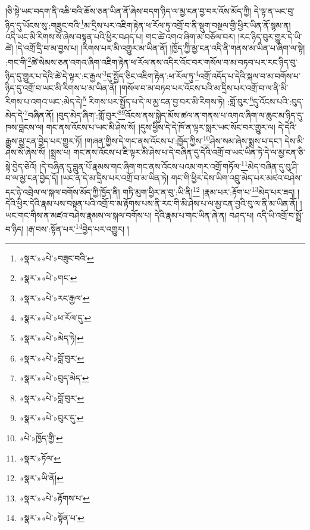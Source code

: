 །ཅི་སྟེ་ཡང་བདག་ནི་འཆི་བའི་ཆོས་ཅན་ཡིན་ནོ་ཞེས་བདག་ཉིད་ལ་མྱ་ངན་བྱ་བར་འོས་མོད་ཀྱི། དེ་ལྟ་ན་ཡང་བུ་ཉིད་དུ་ཡོངས་སུ་:གཟུང་བའི་\footnote{«སྣར་»«པེ་»བཟུང་བའི་}མ་དྲིས་པར་འཇིག་རྟེན་ཕ་རོལ་ཏུ་འགྲོ་བ་ནི་སྡུག་བསྔལ་གྱི་ཕྱིར་ཡིན་ནོ་སྙམ་ན། འདི་ཡང་མི་རིགས་སོ་ཞེས་བསྟན་པའི་ཕྱིར་བཤད་པ། གང་ཚེ་འགའ་ཞིག་མ་བཅོལ་བར། །རང་ཉིད་བུར་གྱུར་དེ་ཡི་ཚེ། །དེ་འགྲོ་དྲི་བ་མ་བྱས་པ། །རིགས་པར་མི་འགྱུར་མ་ཡིན་ནོ། །ཁྱོད་ཀྱི་མྱ་ངན་འདི་ནི་གནས་མ་ཡིན་པ་ཞིག་ལ་སྟེ། :གང་གི་\footnote{«སྣར་»«པེ་»གང་}ཚེ་སེམས་ཅན་འགའ་ཞིག་འཇིག་རྟེན་ཕ་རོལ་ནས་འདིར་འོང་བར་གསོལ་བ་མ་བཏབ་པར་རང་ཉིད་བུ་ཉིད་དུ་གྱུར་པ་དེའི་ཚེ་དེ་ལྟར་:ང་རྒྱལ་\footnote{«སྣར་»«པེ་»རང་རྒྱལ་}དུ་སྤྱོད་ཅིང་འཇིག་རྟེན་:ཕ་རོལ་ཏུ་\footnote{«སྣར་»«པེ་»ཕ་རོལ་དུ་}འགྲོ་འདོད་པ་དེའི་སྐལ་བ་མ་བགོས་པ་ཉིད་དུ་འགྲོ་བ་ཡང་མི་རིགས་པ་མ་ཡིན་ནོ། །གསོལ་བ་མ་བཏབ་པར་འོངས་པའི་མ་དྲིས་པར་འགྲོ་བ་ལ་ནི་མི་རིགས་པ་འགའ་ཡང་:མེད་དེ།\footnote{«སྣར་»«པེ་»མེད་ཏེ།} རིགས་པར་སྤྱོད་པ་དེ་ལ་མྱ་ངན་བྱ་བར་མི་རིགས་ཏེ། :གློ་བུར་\footnote{«སྣར་»«པེ་»བློ་བུར་}དུ་འོངས་པའི་:བུད་མེད་དེ་\footnote{«སྣར་»«པེ་»བུད་མེད་}བཞིན་ནོ། །བུད་མེད་ཞིག་:གློ་བུར་\footnote{«སྣར་»«པེ་»བློ་བུར་}\footnote{«སྣར་»«པེ་»བུར་དུ་}འོངས་ནས་སྐྱེད་མོས་ཚལ་ན་གནས་པ་འགའ་ཞིག་ལ་ཆུང་མ་ཉིད་དུ་ཁས་བླངས་ལ། གང་ནས་འོངས་པ་ཡང་མི་ཤེས་སོ། །དུས་ཕྱིས་དེ་དེ་ཁོ་ན་ལྟར་སླར་ཡང་སོང་བར་གྱུར་ལ། དེ་དེའི་རྒྱུས་མྱ་ངན་བྱེད་པར་གྱུར་ཏོ། །གཞན་གྱིས་དེ་གང་ནས་འོངས་པ་:ཁྱོད་ཀྱིས་\footnote{«པེ་»ཁྱོད་གྱི་}ཤེས་སམ་ཞེས་སྨྲས་པ་དང་། དེས་མི་ཤེས་སོ་ཞེས་སོ། །སྨྲས་པ། གང་ནས་འོངས་པ་ཇི་ལྟར་མི་ཤེས་པ་དེ་བཞིན་དུ་དེའི་འགྲོ་བ་ཡང་ཡིན་ཏེ་དེ་ལ་མྱ་ངན་ཅི་སྟེ་བྱེད་ཅེའོ། །དེ་བཞིན་དུ་བླུན་པོ་རྣམས་གང་ཞིག་གང་ནས་འོངས་པའམ་གར་འགྲོ་གཏོལ་\footnote{«སྣར་»ཏོལ་}མེད་བཞིན་དུ་བུ་ཤི་བ་ལ་མྱ་ངན་བྱེད་དོ། །ཡང་ན་དེ་མ་དྲིས་པར་འགྲོ་བ་མ་ཡིན་ཏེ། གང་གི་ཕྱིར་དེས་ཡིག་འབྲུ་མེད་པར་མཛའ་བཤེས་དང་ཉེ་འབྲེལ་ལ་སྐལ་བགོས་མོད་ཀྱི་ཁྱོད་ནི། གཏི་མུག་ཕྱིར་ན་བུ་:ཡི་ནི།\footnote{«སྣར་»ཡི་ནོ།} །རྣམ་པར་:རྟོག་པ་\footnote{«སྣར་»«པེ་»རྟོགས་པ་}མེད་པར་ཟད། །དེའི་ཕྱིར་དེའི་རྣམ་པས་བསྟན་པའི་འགྲོ་བ་མ་རྟོགས་པས་ནི་རང་གི་མི་ཤེས་པ་ལ་མྱ་ངན་བྱའི་བུ་ལ་ནི་མ་ཡིན་ནོ། །ཡང་གང་གིས་ན་མཛའ་བཤེས་རྣམས་ལ་སྐལ་བགོས་པ། དེའི་རྣམ་པ་གང་ཡིན་ཞེ་ན། བཤད་པ། འདི་ཡི་འགྲོ་བ་སྤྲོ་བ་ཉིད། །རྒ་བས་:སྟོན་པར་\footnote{«སྣར་»«པེ་»སྟོན་པ་}བྱེད་པར་འགྱུར། །
